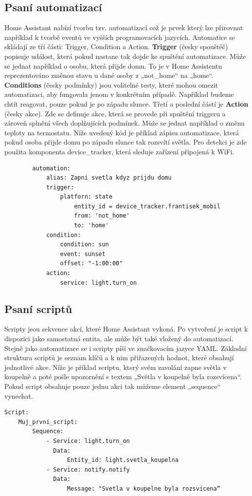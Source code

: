 \documentclass[a4paper,12pt,czech,bibliography=totoc]{scrbook}
\begin{document}
	\subsection{Psaní automatizací}
	Home Assistant nabízí tvorbu tzv. automatizací což je prvek který lze přirovnat například k tvorbě eventů ve vyšších programovacích jazycích.
	Automatice se skládají ze tří části: Trigger, Condition a Action.
	\cite{u93u76ihSFaMdU5g}
	\newline
	\textbf{Trigger} (česky spouštěč) popisuje událost, která pokud nastane tak dojde ke spuštění automatizace. Může se jednat například o osobu, která přijde domu. To je v Home Assistentu reprezentováno změnou stavu u dané osoby z „not\_home“ na „home“.
	\newline
	\textbf{Conditions} (česky podmínky) jsou volitelné testy, které mohou omezit automatizaci, aby fungovala jenom v konkrétním případě. Například budeme chtít reagovat, pouze pokud je po západu slunce.
	\newline
	Třetí a poslední částí je \textbf{Action} (česky akce). Zde se definuje akce, která se provede při spuštění triggeru a zároveň splnění všech doplňujících podmínek. Může se jednat například o změnu teploty na termostatu.
	\newline
	Níže uvedený kód je příklad zápisu automatizace, která pokud osoba přijde domu po západu slunce tak rozsvítí světla. Pro detekci je zde použita komponenta device\_tracker, která sleduje zařízení připojená k WiFi.
	\newpage
	\begin{lstlisting}
		automation:
			alias: Zapni svetla kdyz prijdu domu
			trigger:
				platforn: state
					entity_id = device_tracker.frantisek_mobil
					from: 'not_home'
					to: 'home'
			condition:
				condition: sun
				event: sunset
				offset: "-1:00:00"
			action:
				service: light.turn_on
	\end{lstlisting}
	\subsection{Psaní scriptů}
	Scripty jsou sekvence akcí, které Home Assistant vykoná. Po vytvoření je script k dispozici jako samostatná entita, ale může být také vložený do automatizací. Stejně jako automatizace se i scripty píší ve značkovacím jazyce YAML. Základní struktura scriptů je seznam klíčů a k nim přiřazených hodnot, které obsahují jednotlivé akce.
	\newline
	Níže je příklad scriptu, který svém zavolání zapne světla v koupelně a poté pošle upozornění s textem „Světla v koupelně byla rozsvícena“. Pokud script obsahuje pouze jednu akci tak můžeme element „sequence“ vynechat.
	\cite{HA_Scripts}
		\begin{lstlisting}
Script:
	Muj_prvni_script:
		Sequence:
			- Service: light.turn_on
			  Data:
				  Entity_id: light.svetla_koupelna
			- Service: notify.notify
			  Data:
				  Message: "Svetla v koupelne byla rozsvicena“ 
	\end{lstlisting}
	
\end{document}
